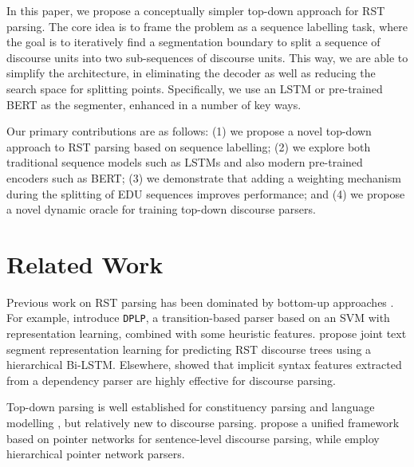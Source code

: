\documentclass[11pt,a4paper]{article}
\begin{document}
In this paper, we propose a conceptually simpler top-down approach for RST parsing. The core idea is to frame the problem as a sequence labelling
task, where the goal is to iteratively find a segmentation boundary to
split a sequence of discourse units into two sub-sequences of discourse
units. This way, we are able to simplify the architecture, in
eliminating the decoder as well as reducing the search space for splitting points. Specifically, we use an LSTM \cite{Hochreiter+:1997}  or pre-trained BERT \cite{devlin-etal-2019-bert} as  the segmenter, enhanced in a number of key ways.










Our primary contributions are as follows: (1) we propose a novel
top-down approach to RST parsing based on sequence labelling; (2) we
explore both traditional sequence models such as LSTMs
and also modern pre-trained encoders such as
BERT; (3) we demonstrate that adding
a weighting mechanism during the splitting of EDU sequences improves 
performance; and (4) we propose a novel dynamic oracle for training 
top-down discourse parsers.


\section{Related Work}

Previous work on RST parsing has been dominated by bottom-up approaches \cite{hernault2010hilda,joty-etal-2013-combining,li-etal-2016-discourse,braud-etal-2017-cross-lingual,wang-etal-2017-two}.
For example, \citet{ji-eisenstein-2014-representation} introduce \texttt{DPLP}, a transition-based parser based on an SVM with representation learning,
combined with some heuristic features. \citet{braud-etal-2016-multi}
propose joint text segment representation learning for predicting RST discourse trees using a hierarchical Bi-LSTM. Elsewhere, \citet{yu2018transition} showed that implicit syntax features extracted from a dependency parser \cite{dozat2017deep} are highly effective for discourse parsing.


Top-down parsing is well established for constituency parsing
and language modelling \cite{johnson-1995-squibs,roark-johnson-1999-efficient,roark-2001-probabilistic,frost-etal-2007-modular},
but relatively new to discourse parsing. \citet{lin-etal-2019-unified} propose a unified framework based on pointer networks for sentence-level discourse parsing, while \citet{liu2019hierarchical} employ hierarchical pointer network parsers.
\end{document}
